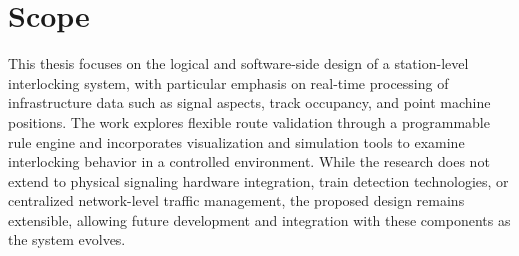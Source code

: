 \section{Scope}
This thesis focuses on the logical and software-side design of a station-level interlocking system, with particular emphasis on real-time processing of infrastructure data such as signal aspects, track occupancy, and point machine positions. The work explores flexible route validation through a programmable rule engine and incorporates visualization and simulation tools to examine interlocking behavior in a controlled environment. While the research does not extend to physical signaling hardware integration, train detection technologies, or centralized network-level traffic management, the proposed design remains extensible, allowing future development and integration with these components as the system evolves.
